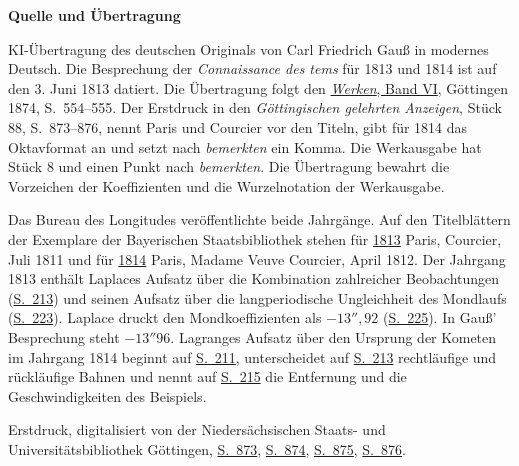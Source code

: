 \clearpage\thispagestyle{empty}
\begin{center}\textbf{Quelle und Übertragung}\end{center}
\hypertarget{connaissance1813-source-note}{}\label{connaissance1813-source-note}
\noindent KI-Übertragung des deutschen Originals von Carl Friedrich Gauß in modernes Deutsch. Die Besprechung der \emph{Connaissance des tems} für 1813 und 1814 ist auf den 3. Juni 1813 datiert. Die Übertragung folgt den \href{https://gdz.sub.uni-goettingen.de/id/PPN236007467}{\emph{Werken}, Band VI}, Göttingen 1874, S.\ 554--555. Der Erstdruck in den \emph{Göttingischen gelehrten Anzeigen}, Stück 88, S.\ 873--876, nennt Paris und Courcier vor den Titeln, gibt für 1814 das Oktavformat an und setzt nach \emph{bemerkten} ein Komma. Die Werkausgabe hat Stück 8 und einen Punkt nach \emph{bemerkten}. Die Übertragung bewahrt die Vorzeichen der Koeffizienten und die Wurzelnotation der Werkausgabe.

\noindent Das Bureau des Longitudes veröffentlichte beide Jahrgänge. Auf den Titelblättern der Exemplare der Bayerischen Staatsbibliothek stehen für \href{https://api.digitale-sammlungen.de/iiif/image/v2/bsb10538233_00005/full/1450,/0/default.jpg}{1813} Paris, Courcier, Juli 1811 und für \href{https://api.digitale-sammlungen.de/iiif/image/v2/bsb10538234_00005/full/1450,/0/default.jpg}{1814} Paris, Madame Veuve Courcier, April 1812. Der Jahrgang 1813 enthält Laplaces Aufsatz über die Kombination zahlreicher Beobachtungen (\href{https://api.digitale-sammlungen.de/iiif/image/v2/bsb10538233_00217/full/1450,/0/default.jpg}{S.\ 213}) und seinen Aufsatz über die langperiodische Ungleichheit des Mondlaufs (\href{https://api.digitale-sammlungen.de/iiif/image/v2/bsb10538233_00227/full/1450,/0/default.jpg}{S.\ 223}). Laplace druckt den Mondkoeffizienten als $-13''{,}92$ (\href{https://api.digitale-sammlungen.de/iiif/image/v2/bsb10538233_00229/full/1450,/0/default.jpg}{S.\ 225}). In Gauß' Besprechung steht $-13''96$. Lagranges Aufsatz über den Ursprung der Kometen im Jahrgang 1814 beginnt auf \href{https://api.digitale-sammlungen.de/iiif/image/v2/bsb10538234_00215/full/1450,/0/default.jpg}{S.\ 211}, unterscheidet auf \href{https://api.digitale-sammlungen.de/iiif/image/v2/bsb10538234_00217/full/1450,/0/default.jpg}{S.\ 213} rechtläufige und rückläufige Bahnen und nennt auf \href{https://api.digitale-sammlungen.de/iiif/image/v2/bsb10538234_00219/full/1450,/0/default.jpg}{S.\ 215} die Entfernung und die Geschwindigkeiten des Beispiels.

\noindent Erstdruck, digitalisiert von der Niedersächsischen Staats- und Universitätsbibliothek Göttingen, \href{https://images.p.sub.uni-goettingen.de/iiif/image/gdz:PPN319721507_1813:00000877/full/1650,/0/default.jpg}{S.\ 873}, \href{https://images.p.sub.uni-goettingen.de/iiif/image/gdz:PPN319721507_1813:00000878/full/1650,/0/default.jpg}{S.\ 874}, \href{https://images.p.sub.uni-goettingen.de/iiif/image/gdz:PPN319721507_1813:00000879/full/1650,/0/default.jpg}{S.\ 875}, \href{https://images.p.sub.uni-goettingen.de/iiif/image/gdz:PPN319721507_1813:00000880/full/1650,/0/default.jpg}{S.\ 876}.
\clearpage

